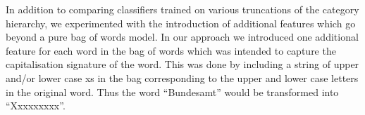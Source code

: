 
In addition to comparing classifiers trained on various truncations of the category hierarchy, we experimented with the introduction of additional features which go beyond a pure bag of words model. In our approach we introduced one additional feature for each word in the bag of words which was intended to capture the capitalisation signature of the word. This was done by including a string of upper and/or lower case xs in the bag corresponding to the upper and lower case letters in the original word. Thus the word ``Bundesamt'' would be transformed into ``Xxxxxxxxx''.


\vspace*{2cm}





\vspace*{2cm}


